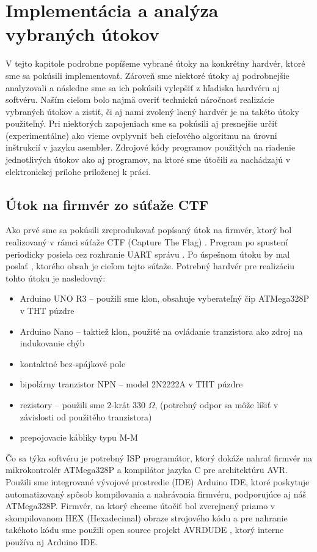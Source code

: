 \chapter{Implementácia a analýza vybraných útokov}
\label{kap:utoky}

V tejto kapitole podrobne popíšeme vybrané útoky na konkrétny hardvér, ktoré sme sa pokúsili implementovať. Zároveň sme niektoré útoky aj podrobnejšie analyzovali a následne sme sa ich pokúsili vylepšiť z hľadiska hardvéru aj softvéru. Naším cieľom bolo najmä overiť technickú náročnosť realizácie vybraných útokov a zistiť, či aj nami zvolený lacný hardvér je na takéto útoky použiteľný. Pri niektorých zapojeniach sme sa pokúsili aj presnejšie určiť (experimentálne) ako vieme ovplyvniť beh cieľového algoritmu na úrovni inštrukcií v jazyku asembler. Zdrojové kódy programov použitých na riadenie jednotlivých útokov ako aj programov, na ktoré sme útočili sa nachádzajú v elektronickej prílohe priloženej k práci.

\section{Útok na firmvér zo súťaže CTF} \label{kap3:sek:utokNaFirmverCTF}
Ako prvé sme sa pokúsili zreprodukovať popísaný útok na firmvér, ktorý bol realizovaný v rámci súťaže CTF (Capture The Flag) \cite{vccOnTheCheap}. Program po spustení periodicky posiela cez rozhranie UART správu . Po úspešnom útoku by mal poslať , ktorého obsah je cieľom tejto súťaže. Potrebný hardvér pre realizáciu tohto útoku je nasledovný:
\begin{itemize}
    \item Arduino UNO R3 -- použili sme klon, obsahuje vyberateľný čip ATMega328P v THT púzdre
    \item Arduino Nano -- taktiež klon, použité na ovládanie tranzistora ako zdroj na indukovanie chýb
    \item kontaktné bez-spájkové pole
    \item bipolárny tranzistor NPN -- model 2N2222A v THT púzdre
    \item rezistory -- použili sme 2-krát 330 $\Omega$, (potrebný odpor sa môže líšiť v závislosti od použitého tranzistora)
    \item prepojovacie kábliky typu M-M
\end{itemize}
Čo sa týka softvéru je potrebný ISP programátor, ktorý dokáže nahrať firmvér na mikrokontrolér ATMega328P a kompilátor jazyka C pre architektúru AVR. Použili sme integrované vývojové prostredie (IDE) Arduino IDE, ktoré poskytuje automatizovaný spôsob kompilovania a nahrávania firmvéru, podporujúce aj náš ATMega328P. Firmvér, na ktorý chceme útočiť bol zverejnený priamo v skompilovanom HEX (Hexadecimal) obraze strojového kódu a pre nahranie takéhoto kódu sme použili open source projekt AVRDUDE \cite{avrdude}, ktorý interne používa aj Arduino IDE.

